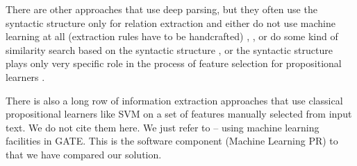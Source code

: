 \documentclass[runningheads,a4paper]{llncs}
\begin{document}


There are other approaches that use deep parsing, but they often use the syntactic structure only for relation extraction and either do not use machine learning at all (extraction rules have to be handcrafted) 
\cite{Yakushiji2001},
\cite{RelEx},
\cite{Buyko:dependencyGraphs}
or do some kind of similarity search based on the syntactic structure
\cite{Etzioni08informationExtraction},
\cite{Wang:SimilarityTreeSkeletons}
or the syntactic structure plays only very specific role in the process of feature selection for propositional learners %
\cite{Bunescu:DependencyPaths}.

There is also a long row of information extraction approaches that use classical propositional learners like SVM on a set of features manually selected from input text. We do not cite them here. We just refer to \cite{Yaoyong09a} -- using machine learning facilities in GATE. This is the software component (Machine Learning PR) to that we have compared our solution.
\end{document}
